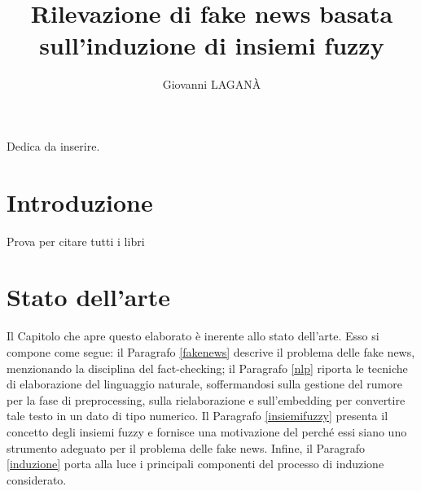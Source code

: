 \documentclass[12pt]{report}
\theoremstyle{definition}
\begin{document}
\title{Rilevazione di fake news basata sull'induzione di insiemi fuzzy}
\author{Giovanni LAGANÀ}
%
%
%
\beforepreface
        {\hfill \Large {\sl \begin{flushright} Dedica da inserire.         
\end{flushright}         }}
%
%
%
%
\afterpreface

%
%

\chapter*{Introduzione}
  
\onehalfspacing

Prova per citare tutti i libri
\cite{1,2,3,4,5,6,7,8,9,10,11,12,13,14,15,16,17,18,19,20,21,22}


\chapter{Stato dell'arte}
\label{Capitolo 1}
\onehalfspacing

Il Capitolo che apre questo elaborato è inerente allo stato dell'arte. Esso si compone come segue: il Paragrafo \ref{fakenews} descrive il problema delle fake news, menzionando la disciplina del fact-checking; il Paragrafo \ref{nlp} riporta le tecniche di elaborazione del linguaggio naturale, soffermandosi sulla gestione del rumore per la fase di preprocessing, sulla rielaborazione e sull'embedding per convertire tale testo in un dato di tipo numerico.
Il Paragrafo \ref{insiemifuzzy} presenta il concetto degli insiemi fuzzy e fornisce una motivazione del perché essi siano uno strumento adeguato per il problema delle fake news.
Infine, il Paragrafo \ref{induzione} porta alla luce i principali componenti del processo di induzione considerato.
\end{document}
